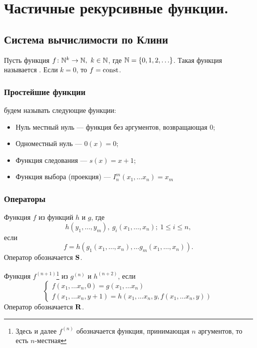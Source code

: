\chapter{Частичные рекурсивные функции.} 
\section{Система вычислимости по Клини}

\begin{defn}[]
	Пусть функция $ f\colon \N^{k} \to  \N, ~ k \in \N$, где $ \N = \{0, 1, 2, \ldots \}$. Такая функция называется . Если $ k = 0$, то $ f = \const$.
\end{defn}

\subsection{Простейшие функции} 
 будем называть следующие функции:
\begin{itemize}
	\item Нуль местный нуль --- функция без аргументов, возвращающая $ 0$;
	\item Одноместный нуль --- $ 0(x) = 0$;
	\item Функция следования --- $ s(x) = x + 1$;
	\item Функция выбора (проекция) ---  $ I_{n}^{m}(x_1, \ldots x_{n}) = x_m$
\end{itemize}
\subsection{Операторы}
\begin{defn}
	Функция $ f$  из функций $ h$ и $ g$, где
	\[
		h(y_1, \ldots , y_m), ~ g_i(x_1, \ldots , x_n); ~ 1 \le i \le n
	,\] 
	если 
	\[
		f = h(g_1(x_1, \ldots, x_{n}), \ldots g_m(x_1, \ldots , x_{n}))
	.\] 
	Оператор обозначается $\S$.
\end{defn}
\begin{defn}
	Функция $ f^{(n+1)} $\footnote{Здесь и далее $ f^{(n)}$ обозначается функция, принимающая $ n$ аргументов, то есть $ n$-местная}
	 из $ g^{(n)}$  и $ h^{(n+2)}$, если 
	\[
	\begin{cases}
		f(x_1, \ldots x_{n}, 0) = g(x_1, \ldots x_{n}) \\
		f(x_1, \ldots x_{n}, y+1) = h(x_1, \ldots x_{n}, y, f(x_1, \ldots x_{n}, y))
	\end{cases}
	\] 
	Оператор обозначается $ \R$.
\end{defn}


